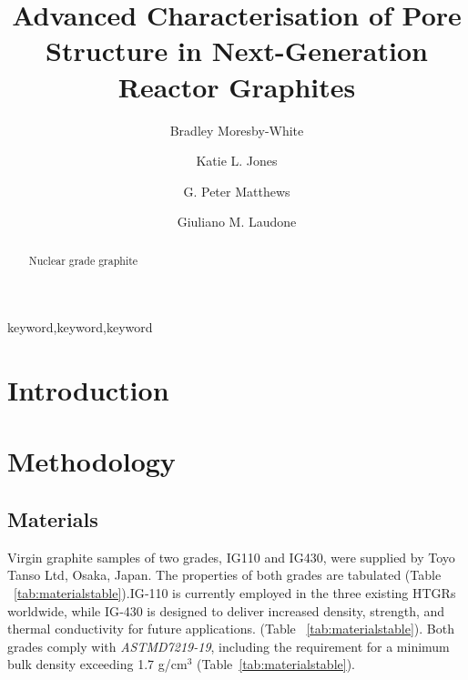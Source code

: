 \documentclass[3p,twocolumn]{elsarticle}
\begin{document}
\begin{frontmatter}
\title{Advanced Characterisation of Pore Structure in Next-Generation Reactor Graphites}
\author[plym]{Bradley Moresby-White}
\author[plym]{Katie L. Jones}
\author[plym]{G. Peter Matthews}
\author[plym]{Giuliano M. Laudone}
\address[plym]{Faculty of Science and Engineering, University of Plymouth, Plymouth, UK}
\begin{abstract}
Nuclear grade graphite
\end{abstract}
\begin{keyword}keyword\sep keyword\sep keyword\end{keyword}
\end{frontmatter}
\section{Introduction}
\section{Methodology}

\subsection{Materials}

Virgin graphite samples of two grades, IG110 and IG430, were supplied by Toyo
Tanso Ltd\texttrademark{}, Osaka, Japan. The properties of both grades are
tabulated (Table ~\ref{tab:materialstable}).IG‑110 is currently employed in the
three existing HTGRs worldwide, while IG‑430 is designed to deliver increased
density, strength, and thermal conductivity for future
applications.\citep{toyotanso_atomic_nuclear} (Table ~\ref{tab:materialstable}).
Both grades comply with \textit{ASTMD7219-19}, including the requirement for a
minimum bulk density exceeding 1.7 g/cm$^3$ \citep{ASTMD7219-19}
(Table~\ref{tab:materialstable}). 
\begin{table}
  \centering
  \caption{Manufacturer dataset for IG-110 and IG-430 \citep{Jones2018}}
  \label{tab:materialstable}
\end{table}
\end{document}
